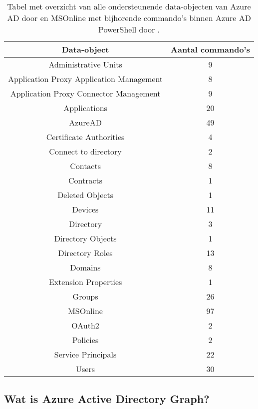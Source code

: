 \begin{table}
    \small
    \centering
    \begin{tabular}{ |c|c| } 
        \hline
        \textbf{Data-object} & \textbf{Aantal commando's} \\
        \hline
        Administrative Units & 9 \\ 
        Application Proxy Application Management & 8 \\ 
        Application Proxy Connector Management & 9 \\
        Applications & 20 \\ 
        AzureAD & 49 \\ 
        Certificate Authorities & 4 \\ 
        Connect to directory & 2 \\ 
        Contacts & 8 \\ 
        Contracts & 1 \\ 
        Deleted Objects & 1 \\ 
        Devices & 11 \\    
        Directory & 3 \\
        Directory Objects & 1 \\ 
        Directory Roles & 13 \\ 
        Domains & 8 \\ 
        Extension Properties & 1 \\ 
        Groups & 26 \\ 
        MSOnline & 97 \\
        OAuth2 & 2 \\ 
        Policies & 2 \\ 
        Service Principals & 22 \\ 
        Users & 30 \\ 
        \hline
    \end{tabular}
    \caption[Tabel Azure AD en MSonline data-objecten]{Tabel met overzicht van alle ondersteunende data-objecten van Azure \ac{AD} door \textcite{Microsoft2023i} en MSOnline met bijhorende commando's binnen Azure \ac{AD} PowerShell door \textcite{Microsofta}.}
    \label{AADT}
\end{table}

\subsection{Wat is Azure Active Directory Graph?}


